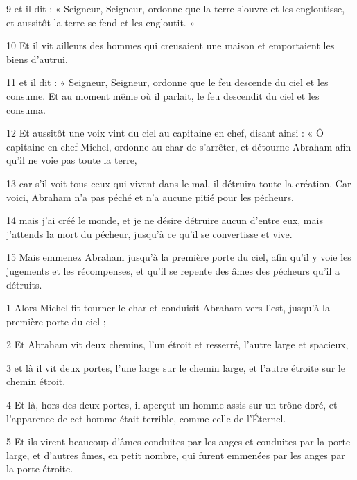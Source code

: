 \par 9 et il dit : « Seigneur, Seigneur, ordonne que la terre s'ouvre et les engloutisse, et aussitôt la terre se fend et les engloutit. »

\par 10 Et il vit ailleurs des hommes qui creusaient une maison et emportaient les biens d'autrui,

\par 11 et il dit : « Seigneur, Seigneur, ordonne que le feu descende du ciel et les consume. Et au moment même où il parlait, le feu descendit du ciel et les consuma.

\par 12 Et aussitôt une voix vint du ciel au capitaine en chef, disant ainsi : « Ô capitaine en chef Michel, ordonne au char de s'arrêter, et détourne Abraham afin qu'il ne voie pas toute la terre,

\par 13 car s'il voit tous ceux qui vivent dans le mal, il détruira toute la création. Car voici, Abraham n’a pas péché et n’a aucune pitié pour les pécheurs,

\par 14 mais j'ai créé le monde, et je ne désire détruire aucun d'entre eux, mais j'attends la mort du pécheur, jusqu'à ce qu'il se convertisse et vive.

\par 15 Mais emmenez Abraham jusqu'à la première porte du ciel, afin qu'il y voie les jugements et les récompenses, et qu'il se repente des âmes des pécheurs qu'il a détruits.


\par 1 Alors Michel fit tourner le char et conduisit Abraham vers l'est, jusqu'à la première porte du ciel ;

\par 2 Et Abraham vit deux chemins, l'un étroit et resserré, l'autre large et spacieux,

\par 3 et là il vit deux portes, l'une large sur le chemin large, et l'autre étroite sur le chemin étroit.

\par 4 Et là, hors des deux portes, il aperçut un homme assis sur un trône doré, et l'apparence de cet homme était terrible, comme celle de l'Éternel.

\par 5 Et ils virent beaucoup d'âmes conduites par les anges et conduites par la porte large, et d'autres âmes, en petit nombre, qui furent emmenées par les anges par la porte étroite.

